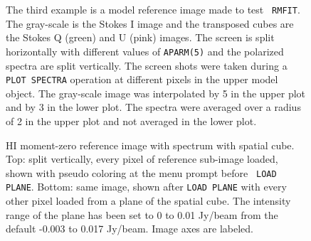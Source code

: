 \documentclass[twoside]{article}
\newcommand{\Hi}[1]{\textcolor{hicol}{#1}}
\newcommand{\putfig}[1]{\texttt{[image: \#1]}}
\begin{document}
\begin{figure}
\begin{center}
\resizebox{5.46in}{!}{\putfig{TVSPCQUa.eps}}
\centerline{\hphantom{MM}}
\resizebox{5.46in}{!}{\putfig{TVSPCQUb.eps}}
\caption{The third example is a model reference image made to test {\tt
    RMFIT}\@.  The gray-scale is the Stokes I image and the transposed
  cubes are the Stokes Q (green) and U (pink) images.  The screen is
  split horizontally with different values of {\tt APARM(5)} and the
  polarized spectra are split vertically.  The screen shots were taken
  during a {\tt PLOT SPECTRA} operation at different pixels in the
  upper model object.  The gray-scale image was interpolated by 5 in
  the upper plot and by 3 in the lower plot.  \Hi{The spectra were
  averaged over a radius of 2 in the upper plot and not averaged in the
  lower plot.}}
\label{fig:QUab}
\end{center}
\end{figure}

\begin{figure}
\begin{center}
\resizebox{5.55in}{!}{\putfig{TVSPCHIe.eps}}
\centerline{\hphantom{MM}}
\resizebox{5.55in}{!}{\putfig{TVSPCHIf.eps}}
\caption{HI moment-zero reference image with spectrum with spatial
  cube.  Top: split vertically, every pixel of reference sub-image
  loaded, shown with pseudo coloring at the menu prompt before {\tt
    LOAD PLANE}\@.  Bottom: same image, shown after {\tt LOAD PLANE}
  with every other pixel loaded from a plane of the spatial cube.
  The intensity range of the plane has been set to 0 to 0.01 Jy/beam
  from the default -0.003 to 0.017 Jy/beam.  \Hi{Image axes are
    labeled.}}
\label{fig:HIef}
\end{center}
\end{figure}
\end{document}

